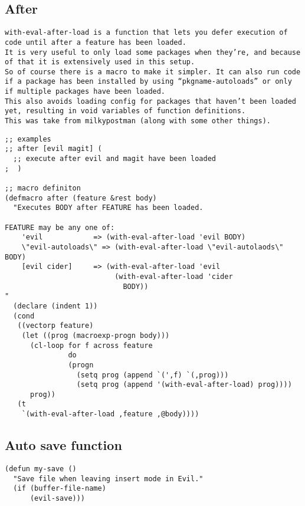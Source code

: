 \documentclass[11pt]{article}
\begin{document}
\subsection*{After}
\label{sec:org65acd41}

\begin{verbatim}
with-eval-after-load is a function that lets you defer execution of code until after a feature has been loaded.
It is very useful to only load some packages when they’re, and because of that it is extensively used in this setup. 
So of course there is a macro to make it simpler. It can also run code if a package has been installed by using “pkgname-autoloads” or only if multiple packages have been loaded.
This also avoids loading config for packages that haven’t been loaded yet, resulting in void variables of function definitions. 
This was take from milkypostman (along with some other things).
\end{verbatim}


\begin{verbatim}
;; examples
;; after [evil magit] (
  ;; execute after evil and magit have been loaded
;  )

;; macro definiton
(defmacro after (feature &rest body)
  "Executes BODY after FEATURE has been loaded.

FEATURE may be any one of:
    'evil            => (with-eval-after-load 'evil BODY)
    \"evil-autoloads\" => (with-eval-after-load \"evil-autolaods\" BODY)
    [evil cider]     => (with-eval-after-load 'evil
                          (with-eval-after-load 'cider
                            BODY))
"
  (declare (indent 1))
  (cond
   ((vectorp feature)
    (let ((prog (macroexp-progn body)))
      (cl-loop for f across feature
               do
               (progn
                 (setq prog (append `(',f) `(,prog)))
                 (setq prog (append '(with-eval-after-load) prog))))
      prog))
   (t
    `(with-eval-after-load ,feature ,@body))))
\end{verbatim}


\subsection*{Auto save function}
\label{sec:org7e1e865}

\begin{verbatim}
(defun my-save ()
  "Save file when leaving insert mode in Evil."
  (if (buffer-file-name)
      (evil-save)))
\end{verbatim}
\end{document}
